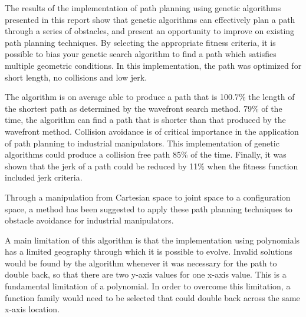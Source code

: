 The results of the implementation of path planning using genetic algorithms presented in this report show that genetic algorithms can effectively plan a path through a series of obstacles, and present an opportunity to improve on existing path planning techniques. By selecting the appropriate fitness criteria, it is possible to bias your genetic search algorithm to find a path which satisfies multiple geometric conditions. In this implementation, the path was optimized for short length, no collisions and low jerk. 

The algorithm is on average able to produce a path that is 100.7\% the length of the shortest path as determined by the wavefront search method. 79\% of the time, the algorithm can find a path that is shorter than that produced by the wavefront method. Collision avoidance is of critical importance in the application of path planning to industrial manipulators. This implementation of genetic algorithms could produce a collision free path 85\% of the time. Finally, it was shown that the jerk of a path could be reduced by 11\% when the fitness function included jerk criteria.

Through a manipulation from Cartesian space to joint space to a configuration space, a method has been suggested to apply these path planning techniques to obstacle avoidance for industrial manipulators.

A main limitation of this algorithm is that the implementation using polynomials has a limited geography through which it is possible to evolve. Invalid solutions would be found by the algorithm whenever it was necessary for the path to double back, so that there are two y-axis values for one x-axis value. This is a fundamental limitation of a polynomial. In order to overcome this limitation, a function family would need to be selected that could double back across the same x-axis location.